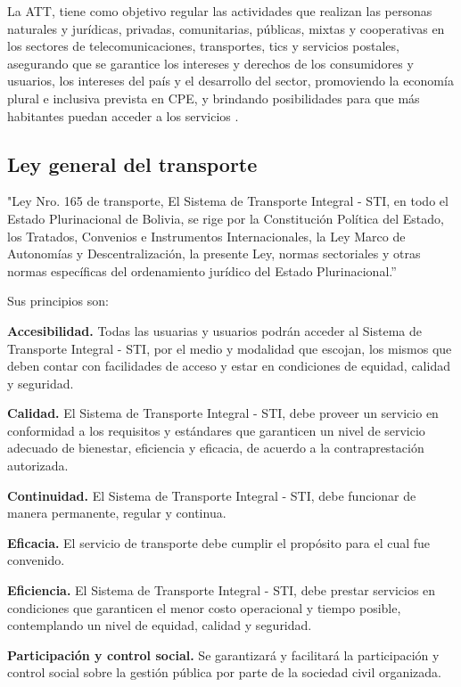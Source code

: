 	La ATT, tiene como objetivo regular las actividades que realizan las personas
	naturales y jurídicas, privadas, comunitarias, públicas, mixtas y cooperativas en los sectores de telecomunicaciones, transportes, tics y servicios postales, asegurando que se garantice los intereses y derechos de los consumidores y usuarios, los intereses del país y el desarrollo del sector, promoviendo la economía plural e inclusiva prevista en CPE, y brindando posibilidades para que más habitantes puedan acceder a los servicios \parencite{institucion2017memoria}.
	\subsection{Ley general del transporte}
	"Ley Nro. 165 de transporte, El Sistema de Transporte Integral - STI, en todo el 	Estado Plurinacional de Bolivia, se rige por la Constitución Política del Estado, los Tratados, Convenios e Instrumentos Internacionales, la Ley Marco de Autonomías y Descentralización, la presente Ley, normas sectoriales y otras normas específicas del ordenamiento jurídico del Estado Plurinacional.” \parencite{ley2011transporte}
	
	Sus principios son:
	
	\textbf{Accesibilidad.} Todas las usuarias y usuarios podrán acceder al Sistema de
	Transporte Integral - STI, por el medio y modalidad que escojan, los mismos que
	deben contar con facilidades de acceso y estar en condiciones de equidad, calidad y seguridad.
	
	\textbf{Calidad.} El Sistema de Transporte Integral - STI, debe proveer un servicio en
	conformidad a los requisitos y estándares que garanticen un nivel de servicio
	adecuado de bienestar, eficiencia y eficacia, de acuerdo a la contraprestación
	autorizada.
	
	\textbf{Continuidad.} El Sistema de Transporte Integral - STI, debe funcionar de manera
	permanente, regular y continua.
	
	\textbf{Eficacia.} El servicio de transporte debe cumplir el propósito para el cual fue convenido.
	
	\textbf{Eficiencia.} El Sistema de Transporte Integral - STI, debe prestar servicios en condiciones que garanticen el menor costo operacional y tiempo posible, contemplando un nivel de equidad, calidad y seguridad.
	
	\textbf{Participación y control social.} Se garantizará y facilitará la participación y control social sobre la gestión pública por parte de la sociedad civil organizada.
	
